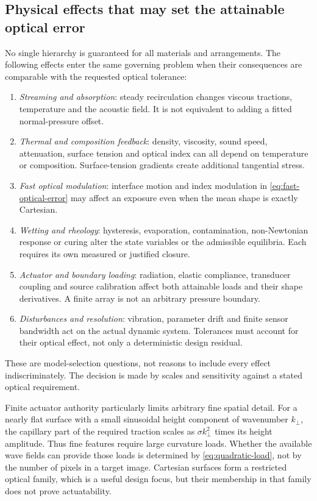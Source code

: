 \subsection{Physical effects that may set the attainable optical error}
No single hierarchy is guaranteed for all materials and arrangements. The
following effects enter the same governing problem when their consequences
are comparable with the requested optical tolerance:
\begin{enumerate}
\item \emph{Streaming and absorption}: steady recirculation changes viscous
tractions, temperature and the acoustic field. It is not equivalent to adding
a fitted normal-pressure offset.
\item \emph{Thermal and composition feedback}: density, viscosity, sound speed,
attenuation, surface tension and optical index can all depend on temperature
or composition. Surface-tension gradients create additional tangential stress.
\item \emph{Fast optical modulation}: interface motion and index modulation in
\cref{eq:fast-optical-error} may affect an exposure even when the mean shape
is exactly Cartesian.
\item \emph{Wetting and rheology}: hysteresis, evaporation, contamination,
non-Newtonian response or curing alter the state variables or the admissible
equilibria. Each requires its own measured or justified closure.
\item \emph{Actuator and boundary loading}: radiation, elastic compliance,
transducer coupling and source calibration affect both attainable loads and
their shape derivatives. A finite array is not an arbitrary pressure boundary.
\item \emph{Disturbances and resolution}: vibration, parameter drift and finite
sensor bandwidth act on the actual dynamic system. Tolerances must account for
their optical effect, not only a deterministic design residual.
\end{enumerate}
These are model-selection questions, not reasons to include every effect
indiscriminately. The decision is made by scales and sensitivity against a
stated optical requirement.

Finite actuator authority particularly limits arbitrary fine spatial detail.
For a nearly flat surface with a small sinusoidal height component of
wavenumber $k_\perp$, the capillary part of the required traction scales as
$\sigma k_\perp^2$ times its height amplitude. Thus fine features require large
curvature loads. Whether the available wave fields can provide those loads is
determined by \cref{eq:quadratic-load}, not by the number of pixels in a target
image. Cartesian surfaces form a restricted optical family, which is a useful
design focus, but their membership in that family does not prove actuatability.

